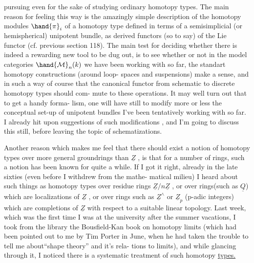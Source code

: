 
pursuing even for the  sake of studying ordinary homotopy types.  The main
reason for feeling this way is the amazingly simple description of the
homotopy modules $\hand{\pi}_{i}$ of a homotopy type defined in terms of a semisimplicial
(or hemispherical) unipotent bundle,   as derived functors 
(so to say) of the Lie functor (cf. previous section 118).  The main test
for deciding whether there is indeed a rewarding new tool to be dug out,
is to see whether or not in the model categories  $\hand{\mathcal{M}}_{n}(k)$ we have been
working with so far,   the standart homotopy constructions (around loop-%
spaces and suspensions) make a sense,  and in such a way of course that
the canonical functor from schematic to discrete homotopy types should com-%
mute to these operations.  It may well turn out that to get a handy forma-%
lism,  one will have still to modify more or less the conceptual set-up
of unipotent bundles I've been tentatively working with so far.  I already
 hit upon suggestions of such modifications , and   I'm
going to discuss this still,  before leaving the topic of schematizations.

Another reason which makes me feel that there should exist a notion of
homotopy types over more general groundrings  than $\underline{Z}$ ,  is that for a number
of rings,  such a notion has been known for quite a while.  If I got it 
right,  already in the late sixties (even before I withdrew from the mathe-%
matical milieu) I heard about such things as homotopy types over residue
 rings $\underline{Z}/n\underline{Z}$ ,  or over rings(such as $\underline{Q}$) which are localizations of $\underline{Z}$ ,  or
over rings such as $\underline{Z}^{\wedge}$  or $\underline{Z}_{p}$ (p-adic integers)  which are completions
of $\underline{Z}$ with respect to a suitable   linear topology.  Last
week,  which was the first time I was at the university  after the
summer vacations,  I took from the library the Bousfield-Kan  book on
homotopy limits (which had been pointed out to me by Tim Porter in June,
when he had taken the trouble to tell me about``shape theory'' and it's rela-%
tions to   limits), and while glancing through it,  I noticed there
 is a systematic treatment of such homotopy \uline{types.}\hand{$\rfloor\!\ulcorner$}


